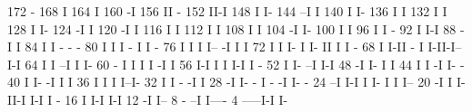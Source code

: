 \begin{Listing}
      172                                    -
      168                                    I
      164                                    I
      160                                   -I
      156                                   II -
      152                                   II-I
      148                                   I  I-
      144                                 --I   I
      140                                 I     I-
      136                                 I      I
      132                                 I      I
      128                                 I      I-
      124                                -I       I
      120                               -I        I
      116                               I         I
      112                               I         I
      108                               I         I
      104                              -I         I-
      100                              I           I
       96                              I           I -
       92                              I           I-I
       88                             -I             I
       84                             I              I -                              - -
       80                             I              I I                        -     I I  -
       76                             I              I I                        I--  -I I  I
       72                             I              I I-                       I I- II I  I -
       68                             I              I-II                    -  I  I-II-I--I-I
       64                             I                 I                  --I  I            I-
       60                           - I                 I                  I I -I             I
       56                           I-I                 I                  I I-I              I -
       52                           I                   I-               --I                  I-I
       48                          -I                    I-              I                      I
       44                          I                      I             -I                      I-  -
       40                          I                      I-           -I                        I  I
       36                          I                       I           I                         I--I-
       32                          I                       I    -     -I                             I
       28                         -I                       I- - I -  -I                              I- -
       24                       --I                         I-I I I- I                                I I--
       20                      -I                             I I-II-I                                I-I I -
       16                      I                              I-I                                         I-I
       12                     -I                                                                            I--
        8                 - --I                                                                               I----
        4            -----I-I                                                                                     I-
 

\end{Listing}
